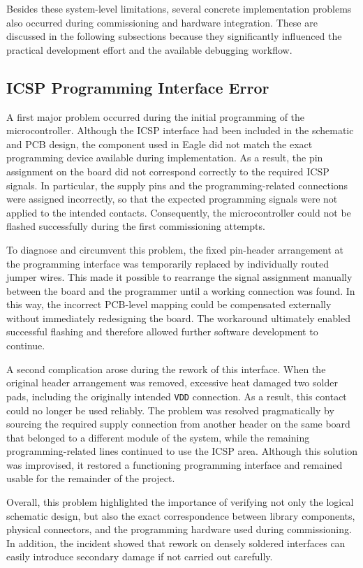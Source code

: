Besides these system-level limitations, several concrete implementation problems also occurred during commissioning and hardware integration. These are discussed in the following subsections because they significantly influenced the practical development effort and the available debugging workflow.

\subsection{ICSP Programming Interface Error}

A first major problem occurred during the initial programming of the microcontroller. Although the ICSP interface had been included in the schematic and PCB design, the component used in Eagle did not match the exact programming device available during implementation. As a result, the pin assignment on the board did not correspond correctly to the required ICSP signals. In particular, the supply pins and the programming-related connections were assigned incorrectly, so that the expected programming signals were not applied to the intended contacts. Consequently, the microcontroller could not be flashed successfully during the first commissioning attempts.

To diagnose and circumvent this problem, the fixed pin-header arrangement at the programming interface was temporarily replaced by individually routed jumper wires. This made it possible to rearrange the signal assignment manually between the board and the programmer until a working connection was found. In this way, the incorrect PCB-level mapping could be compensated externally without immediately redesigning the board. The workaround ultimately enabled successful flashing and therefore allowed further software development to continue.

A second complication arose during the rework of this interface. When the original header arrangement was removed, excessive heat damaged two solder pads, including the originally intended \texttt{VDD} connection. As a result, this contact could no longer be used reliably. The problem was resolved pragmatically by sourcing the required supply connection from another header on the same board that belonged to a different module of the system, while the remaining programming-related lines continued to use the ICSP area. Although this solution was improvised, it restored a functioning programming interface and remained usable for the remainder of the project.

Overall, this problem highlighted the importance of verifying not only the logical schematic design, but also the exact correspondence between library components, physical connectors, and the programming hardware used during commissioning. In addition, the incident showed that rework on densely soldered interfaces can easily introduce secondary damage if not carried out carefully.

